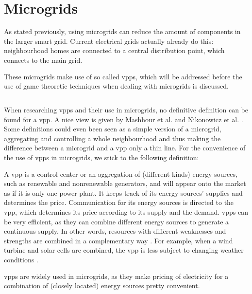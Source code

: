 \section{Microgrids}
As stated previously, using microgrids can reduce the amount of components in the larger smart grid. Current electrical grids actually already do this: neighbourhood homes are connected to a central distribution point, which connects to the main grid.

These microgrids make use of so called \glspl{vpp}, which will be addressed before the use of game theoretic techniques when dealing with microgrids is discussed.

\subsection{}
When researching \glspl{vpp} and their use in microgrids, no definitive definition can be found for a \gls{vpp}. A nice view is given by Mashhour et al. \cite{MashhourMoghaddas-Tafreshi2011} and Nikonowicz et al. \cite{NikonowiczMilewski2012}. Some definitions could even been seen as a simple version of a microgrid, aggregating and controlling a whole neighbourhood \cite{Kumagai2012} and thus making the difference between a microgrid and a \gls{vpp} only a thin line. For the convenience of the use of \glspl{vpp} in microgrids, we stick to the following definition:

A \gls{vpp} is a control center or an aggregation of (different kinds) energy sources, such as renewable and nonrenewable generators, and will appear onto the market as if it is only one power plant. It keeps track of its energy sources' supplies and determines the price. Communication for its energy sources is directed to the \gls{vpp}, which determines its price according to its supply and the demand. \glspl{vpp} can be very efficient, as they can combine different energy sources to generate a continuous supply. In other words, resources with different weaknesses and strengths are combined in a complementary way \cite{Koeppel2003}. For example, when a wind turbine and solar cells are combined, the \gls{vpp} is less subject to changing weather conditions \cite{Tromly2001, Kumagai2012, MashhourMoghaddas-Tafreshi2011, NikonowiczMilewski2012}.

\glspl{vpp} are widely used in microgrids, as they make pricing of electricity for a combination of (closely located) energy sources pretty convenient. 

